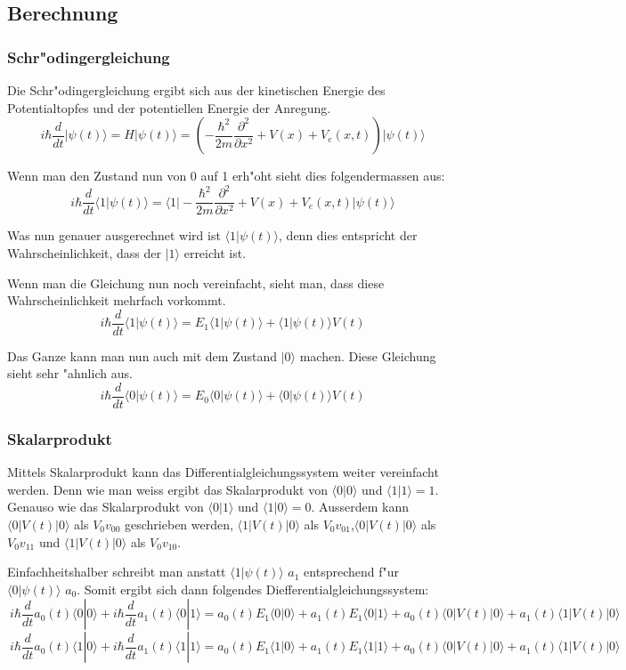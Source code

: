 \begin{refsection}
\subsection{Berechnung}
\subsubsection{Schr"odingergleichung}

Die Schr"odingergleichung ergibt sich aus der kinetischen Energie des
Potentialtopfes und der potentiellen Energie der Anregung.
\[
\ i\hbar\frac{d}{dt}|\psi(t)\rangle = H|\psi(t)\rangle = (-\frac{\hbar^2}{2m} \frac{\partial^2}{\partial x^2}+V(x)+V_{e}(x,t))|\psi(t)\rangle
\]

Wenn man den Zustand nun von 0 auf 1 erh"oht sieht dies folgendermassen aus:
\[
\ i\hbar\frac{d}{dt}\langle1|\psi(t)\rangle = \langle1|-\frac{\hbar^2}{2m} \frac{\partial^2}{\partial x^2}+V(x)+V_{e}(x,t)|\psi(t)\rangle
\]

Was nun genauer ausgerechnet wird ist $\langle1|\psi(t)\rangle$, denn
dies entspricht der Wahrscheinlichkeit, dass der $|1\rangle$ erreicht ist.

Wenn man die Gleichung nun noch vereinfacht, sieht man, dass diese
Wahrscheinlichkeit mehrfach vorkommt.
\[
\ i\hbar\frac{d}{dt}\langle1|\psi(t)\rangle = E_{1}\langle1|\psi(t)\rangle+\langle1|\psi(t)\rangle V(t)
\]

Das Ganze kann man nun auch mit dem Zustand $|0\rangle$ machen. Diese
Gleichung sieht sehr "ahnlich aus.
\[
\ i\hbar\frac{d}{dt}\langle0|\psi(t)\rangle = E_{0}\langle0|\psi(t)\rangle+\langle0|\psi(t)\rangle V(t)
\]

\subsubsection{Skalarprodukt}
Mittels Skalarprodukt kann das Differentialgleichungssystem weiter
vereinfacht werden.
Denn wie man weiss ergibt das Skalarprodukt von $\langle0|0\rangle$
und $\langle1|1\rangle = 1$. Genauso wie das Skalarprodukt von
$\langle0|1\rangle$ und $\langle1|0\rangle = 0$.
Ausserdem kann  $\langle0|V(t)|0\rangle$ als $V_{0}v_{00}$
geschrieben werden, $\langle1|V(t)|0\rangle$ als
$V_{0}v_{01}$,$\langle0|V(t)|0\rangle$ als $V_{0}v_{11}$ und
$\langle1|V(t)|0\rangle$ als $V_{0}v_{10}$.

Einfachheitshalber schreibt man anstatt $\langle1|\psi(t)\rangle$ $a_1$
entsprechend f"ur $\langle0|\psi(t)\rangle$ $a_0$. Somit ergibt sich
dann folgendes Diefferentialgleichungssystem:
\[
\ i\hbar\frac{d}{dt}a_{0}(t)\langle0|0\rangle +i\hbar\frac{d}{dt}a_{1}(t)\langle0|1\rangle = a_{0}(t)E_{1}\langle0|0\rangle + a_{1}(t)E_{1}\langle0|1\rangle + a_{0}(t)\langle0|V(t)|0\rangle+ a_{1}(t)\langle1|V(t)|0\rangle
\]
\[
\ i\hbar\frac{d}{dt}a_{0}(t)\langle1|0\rangle +i\hbar\frac{d}{dt}a_{1}(t)\langle1|1\rangle = a_{0}(t)E_{1}\langle1|0\rangle + a_{1}(t)E_{1}\langle1|1\rangle + a_{0}(t)\langle0|V(t)|0\rangle+ a_{1}(t)\langle1|V(t)|0\rangle
\]


\end{refsection}
